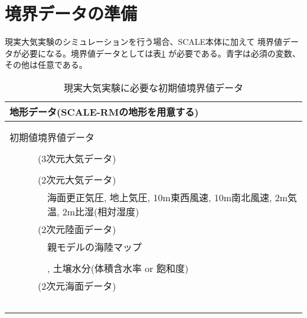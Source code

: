\section{境界データの準備} \label{sec:tutrial_real_prep}

現実大気実験のシミュレーションを行う場合、SCALE本体に加えて
境界値データが必要になる。境界値データとしては表\ref{tab:real_bnd}
が必要である。{\color{blue}青字}は必須の変数、その他は任意である。

\begin{table}[h]
\begin{center}
  \caption{現実大気実験に必要な初期値境界値データ}
  \label{tab:real_bnd}
  \begin{tabularx}{150mm}{llX} \hline
    \multicolumn{3}{l}{地形データ(SCALE-RMの地形を用意する)}\\ \hline
    & \multicolumn{2}{l}{\color{blue}{標高データ}}\\
    & \multicolumn{2}{l}{\color{blue}{土地利用データ}}\\ \hline
    \multicolumn{3}{l}{初期値境界値データ}\\ \hline
    &  \multicolumn{2}{l}{\color{blue}{親モデルの緯度・経度}}\\
    &  \multicolumn{2}{l}{(3次元大気データ)}\\
    & &  \multicolumn{1}{l}{\color{blue}{東西風速, 南北風速, 気温, 比湿(相対湿度), 気圧, ジオポテンシャル高度}} \\
    &  \multicolumn{2}{l}{(2次元大気データ)}\\
    & & 海面更正気圧, 地上気圧, 10m東西風速, 10m南北風速, 2m気温, 2m比湿(相対湿度) \\
    &  \multicolumn{2}{l}{(2次元陸面データ)}\\
    & &  \multicolumn{1}{l}{親モデルの海陸マップ}\\
    & &  \multicolumn{1}{l}{\color{blue}{地表面温度(Skin temp)}}\\
    & &  \multicolumn{1}{l}{{\color{blue}{親モデル土壌データの深さ情報, 土壌温度}}, 土壌水分(体積含水率 or 飽和度)}\\
    &  \multicolumn{2}{l}{(2次元海面データ)}\\
　　& &  \multicolumn{1}{l}{\color{blue}{海面水温(Skin tempがある場合は省略可)}}\\ \hline
  \end{tabularx}
\end{center}
\end{table}


